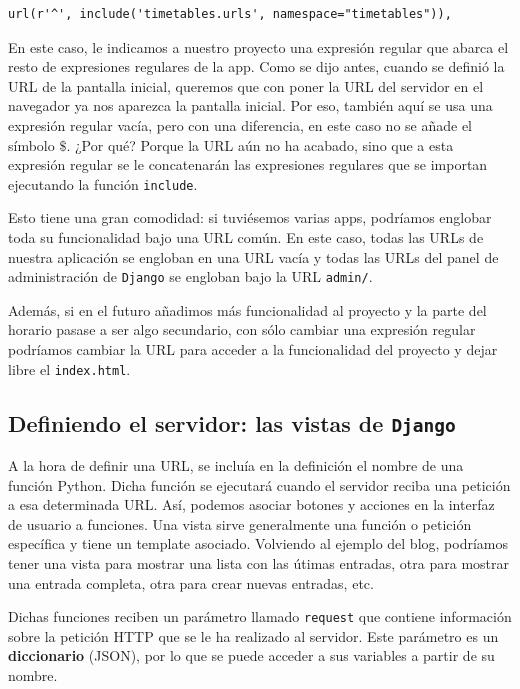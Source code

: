 \begin{verbatim}
url(r'^', include('timetables.urls', namespace="timetables")),
\end{verbatim}

En este caso, le indicamos a nuestro proyecto una expresión regular que abarca el resto de expresiones regulares de la app. Como se dijo antes, cuando se definió la URL de la pantalla inicial, queremos que con poner la URL del servidor en el navegador ya nos aparezca la pantalla inicial. Por eso, también aquí se usa una expresión regular vacía, pero con una diferencia, en este caso no se añade el símbolo $\$$. ¿Por qué? Porque la URL aún no ha acabado, sino que a esta expresión regular se le concatenarán las expresiones regulares que se importan ejecutando la función \texttt{include}. 

Esto tiene una gran comodidad: si tuviésemos varias apps, podríamos englobar toda su funcionalidad bajo una URL común. En este caso, todas las URLs de nuestra aplicación se engloban en una URL vacía y todas las URLs del panel de administración de \texttt{Django} se engloban bajo la URL \texttt{admin/}. 

Además, si en el futuro añadimos más funcionalidad al proyecto y la parte del horario pasase a ser algo secundario, con sólo cambiar una expresión regular podríamos cambiar la URL para acceder a la funcionalidad del proyecto y dejar libre el \texttt{index.html}.

\subsection{Definiendo el servidor: las vistas de \texttt{Django}}
A la hora de definir una URL, se incluía en la definición el nombre de una función Python. Dicha función se ejecutará cuando el servidor reciba una petición a esa determinada URL. Así, podemos asociar botones y acciones en la interfaz de usuario a funciones. Una vista sirve generalmente una función o petición específica y tiene un template asociado. Volviendo al ejemplo del blog, podríamos tener una vista para mostrar una lista con las útimas entradas, otra para mostrar una entrada completa, otra para crear nuevas entradas, etc.

Dichas funciones reciben un parámetro llamado \texttt{request} que contiene información sobre la petición HTTP que se le ha realizado al servidor. Este parámetro es un \textbf{diccionario} (JSON), por lo que se puede acceder a sus variables a partir de su nombre.

